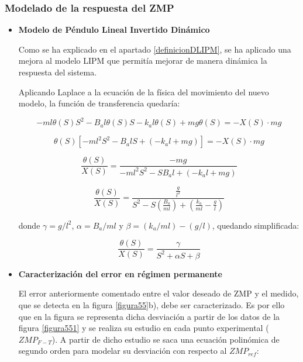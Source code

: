 \subsubsection{Modelado de la respuesta del ZMP}

\begin{itemize}

\item \textbf{Modelo de Péndulo Lineal Invertido Dinámico}

Como se ha explicado en el apartado \ref{definicionDLIPM}, se ha aplicado una mejora al modelo LIPM que permitía mejorar de manera dinámica la respuesta del sistema.

Aplicando Laplace a la ecuación de la física del movimiento del nuevo modelo, la función de transferencia quedaría:

\begin{equation*}
-ml{\theta}(S)S^{2} - B_a l{\theta}(S)S - k_a l\theta(S) + mg\theta(S)=- X(S) \cdot mg
\end{equation*}

\begin{equation*}
{\theta}(S)[-ml^{2}S^{2} - B_a lS + (-k_a l + mg)]=- X(S) \cdot mg
\end{equation*}

\begin{equation*}
\frac{{\theta}(S)}{X(S)}=\frac{-mg}{-ml^{2}S^{2} - S B_a l + (-k_a l + mg)}
\end{equation*}

\begin{equation}
\frac{{\theta}(S)}{X(S)}=\frac{\frac{g}{l^{2}}}{S^{2} - S (\frac{B_a}{ml}) + (\frac{k_a}{ml} - \frac{g}{l})}
\label{ec51}
\end{equation}

donde $\gamma=g/l^{2}$, $\alpha=B_{a}/ml$ y $\beta=(k_{a}/ml) - (g/l)$, quedando simplificada:

\begin{equation}
\frac{\theta(S)}{X(S)}=\frac{\gamma}{S^{2}+\alpha S+\beta }
\label{ec52}
\end{equation}

\item \textbf{Caracterización del error en régimen permanente}

El error anteriormente comentado entre el valor deseado de ZMP y el medido, que se detecta en la figura \ref{figura55}b), debe ser caracterizado. Es por ello que en la figura %
se representa dicha desviación a partir de los datos de la figura \ref{figura551} y se realiza su estudio en cada punto experimental ($ZMP_{F-T}$). A partir de dicho estudio se saca una ecuación polinómica de segundo orden para modelar su desviación con respecto al $ZMP_{ref}$:


\end{itemize}
